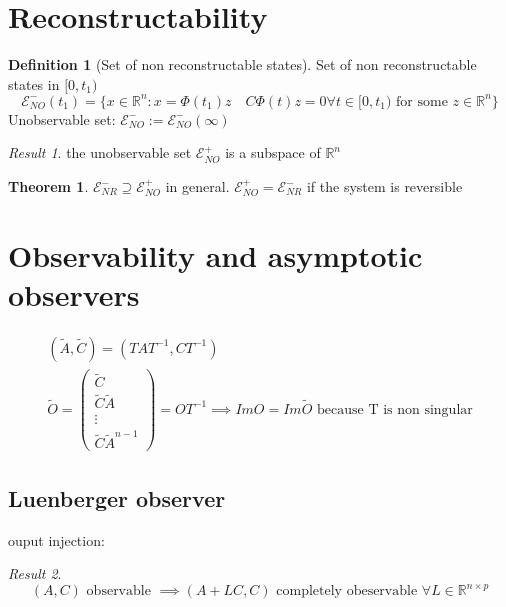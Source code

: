 \documentclass{book}
\newcommand{\R}{\mathbb{R}}
\theoremstyle{definition}
\newtheorem{definition}{Definition}[section]
\newtheorem{theorem}{Theorem}[section]
\theoremstyle{remark}
\theoremstyle{remark}
\newtheorem*{result}{Result}
\begin{document}
\section{Reconstructability}
\begin{definition}[Set of non reconstructable states]
    Set of non reconstructable states in $[0,t_1)$
    \[
        \mathcal{E}^-_{NO}(t_1) = \{x\in \R^n :x=\Phi(t_1)z \quad C\Phi(t)z=0 \forall t \in [0,t_1) \text{ for some } z\in \R^n\}
    \]
    Unobservable set: $\mathcal{E}^-_{NO}:=\mathcal{E}^-_{NO}(\infty)$
\end{definition}
\begin{result}
    the unobservable set $\mathcal{E}^+_{NO}$ is a subspace of $\R^n$
\end{result}
\begin{theorem}
    \( \mathcal{E}^-_{NR} \supseteq \mathcal{E}^+_{NO} \) in general. \(\mathcal{E}^+_{NO} = \mathcal{E}^-_{NR}\) if the system is reversible
\end{theorem}

\section{Observability and asymptotic observers}
\begin{gather*}
    (\tilde{A}, \tilde{C})=(TAT^{-1},CT^{-1})\\
    \tilde{O}=\begin{pmatrix}
        \tilde{C} \\ \tilde{C}\tilde{A} \\ \vdots \\ \tilde{C}\tilde{A}^{n-1}
    \end{pmatrix}=OT^{-1} \implies ImO=Im\tilde{O} \text{ because T is non singular}
\end{gather*}
\subsection{Luenberger observer}
ouput injection:
\begin{result}
    \[
    (A,C) \text{ observable } \implies (A+LC,C) \text{ completely obeservable } \forall L \in \R^{n \times p}      
\]
\end{result}
\end{document}
